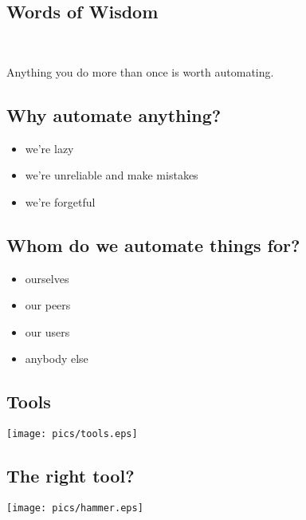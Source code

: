 \documentclass[xga]{xdvislides}
\begin{document}
\subsection{Words of Wisdom}
\\

\newcommand{\gargantuan}{\fontsize{60}{65}\selectfont}
\gargantuan
\begin{center}
Anything you do more than once is worth automating.
\end{center}
\Normalsize

\subsection{Why automate anything?}
\begin{itemize}
	\item we're lazy
	\item we're unreliable and make mistakes
	\item we're forgetful
\end{itemize}

\subsection{Whom do we automate things for?}
\begin{itemize}
	\item ourselves
	\item our peers
	\item our users
	\item anybody else
\end{itemize}

\subsection{Tools}
\vspace*{\fill}
\begin{center}
	\texttt{[image: pics/tools.eps]}
\end{center}
\vspace*{\fill}

\subsection{The right tool?}
\vspace*{\fill}
\begin{center}
	\texttt{[image: pics/hammer.eps]}
\end{center}
\vspace*{\fill}
\end{document}

